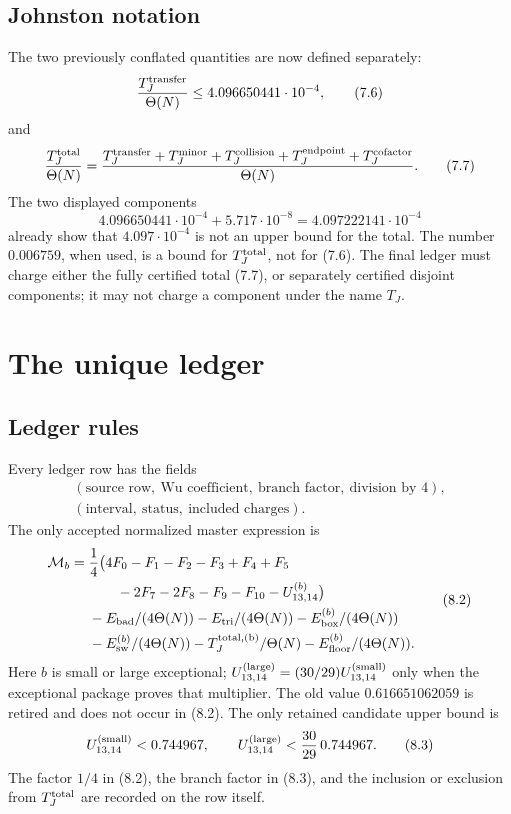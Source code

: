 \documentclass[11pt]{article}
\theoremstyle{definition}
\begin{document}
\subsection{Johnston notation}
\label{sec:johnston}

The two previously conflated quantities are now defined separately:
\[
 \frac{T_J^{\rm transfer}}{\Theta(N)}
 \le 4.096650441\cdot10^{-4},
\tag{7.6}
\]
and
\[
 \frac{T_J^{\rm total}}{\Theta(N)}
 =
 \frac{T_J^{\rm transfer}+T_J^{\rm minor}
 +T_J^{\rm collision}+T_J^{\rm endpoint}
 +T_J^{\rm cofactor}}{\Theta(N)}.
\tag{7.7}
\]
The two displayed components
\[
 4.096650441\cdot10^{-4}
 +5.717\cdot10^{-8}
 =4.097222141\cdot10^{-4}
\tag{7.8}
\]
already show that \(4.097\cdot10^{-4}\) is not an upper bound for the
total.  The number \(0.006759\), when used, is a bound for
\(T_J^{\rm total}\), not for (7.6).  The final ledger must charge either
the fully certified total (7.7), or separately certified disjoint
components; it may not charge a component under the name \(T_J\).

\section{The unique ledger}
\label{sec:ledger}

\subsection{Ledger rules}
\label{sec:ledger-rules}

Every ledger row has the fields
\[
\begin{gathered}
(\text{source row},\ \text{Wu coefficient},\ \text{branch factor},\ \text{division by }4),\\
(\text{interval},\ \text{status},\ \text{included charges}).
\end{gathered}
\tag{8.1}
\]
The only accepted normalized master expression is
\[
\begin{aligned}
 \mathcal M_b={}&\frac14\bigl(
 4F_0-F_1-F_2-F_3+F_4+F_5\\
 &\qquad -2F_7-2F_8-F_9-F_{10}
 -U_{13,14}^{(b)}\bigr)\\
 &-E_{\rm bad}/(4\Theta(N))
 -E_{\rm tri}/(4\Theta(N))
 -E_{\rm box}^{(b)}/(4\Theta(N))\\
 &-E_{\rm sw}^{(b)}/(4\Theta(N))
 -T_J^{\rm total,(b)}/\Theta(N)
 -E_{\rm floor}^{(b)}/(4\Theta(N)).
\end{aligned}
\tag{8.2}
\]
Here \(b\) is small or large exceptional; \(U_{13,14}^{(\rm large)}
=(30/29)U_{13,14}^{(\rm small)}\) only when the exceptional package
proves that multiplier.  The old value \(0.616651062059\) is retired and
does not occur in (8.2).  The only retained candidate upper bound is
\[
 U_{13,14}^{(\rm small)}<0.744967,\qquad
 U_{13,14}^{(\rm large)}<\frac{30}{29}\,0.744967.
\tag{8.3}
\]
The factor \(1/4\) in (8.2), the branch factor in (8.3), and the inclusion
or exclusion from \(T_J^{\rm total}\) are recorded on the row itself.
\end{document}
